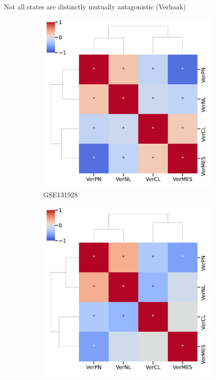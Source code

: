 \documentclass[aspectratio=169,9pt]{beamer}
\begin{document}
    \begin{frame}{Not all states are distinctly mutually antagonistic (Verhaak)}
        \begin{adjustwidth}{-5cm}{-5cm}
            \centering
            \begin{figure}\ContinuedFloat
                \centering
                \begin{subfigure}[c]{0.4\textwidth}
                    \centering
                    \includegraphics[width=\textwidth]{GSEA_GSM3828672_corrplot_Ver}
                    \caption{GSE131928}
                \end{subfigure}
                \begin{subfigure}[c]{0.4\textwidth}
                    \centering
                    \includegraphics[width=\textwidth]{GSEA_TCGA_corrplot_Ver}

\end{subfigure}
\end{figure}
\end{adjustwidth}
\end{frame}
\end{document}

